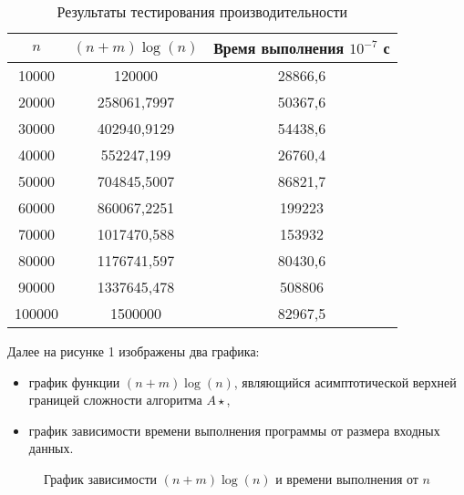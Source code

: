 \documentclass[12pt]{article}
\begin{document}
\begin{table}[h]
    \centering
    \begin{tabular}{|c|c|c|}
        \hline
        \toprule
        $n$ & $(n + m)\log(n)$ & Время выполнения $10^{-7}$ с \\
        \midrule
        \hline
        10000  & 120000       & 28866,6 \\
        20000  & 258061,7997  & 50367,6 \\
        30000  & 402940,9129  & 54438,6 \\
        40000  & 552247,199   & 26760,4 \\
        50000  & 704845,5007  & 86821,7 \\
        60000  & 860067,2251  & 199223  \\
        70000  & 1017470,588  & 153932  \\
        80000  & 1176741,597  & 80430,6 \\
        90000  & 1337645,478  & 508806  \\
        100000 & 1500000      & 82967,5 \\
        \bottomrule
        \hline
    \end{tabular}
    \caption{Результаты тестирования производительности}
    \label{tab:performance}
\end{table}

Далее на рисунке 1 изображены два графика:
\begin{itemize}
    \item график функции $(n + m)\log(n)$, являющийся асимптотической верхней границей сложности алгоритма $A\star$,
    \item график зависимости времени выполнения программы от размера входных данных.
\end{itemize}

\begin{figure}[h]
    \centering
    \caption{График зависимости $(n+m)\log(n)$ и времени выполнения от $n$}
    \label{fig:performance_plot}
\end{figure}
\end{document}
